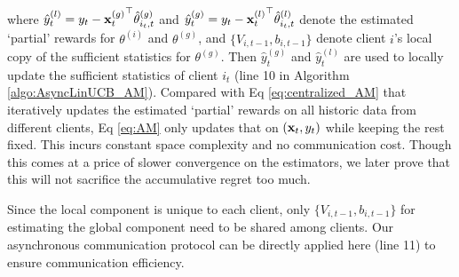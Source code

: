 where $\hat{y}^{(l)}_{t}=y_{t}-{\mathbf{x}_{t}^{(g)}}^{\top} \hat{\theta}^{(g)}_{i_{t},t}$ and $\hat{y}^{(g)}_{t}=y_{t}-{\mathbf{x}_{t}^{(l)}}^{\top} \hat{\theta}^{(l)}_{i_{t},t}$ denote the estimated `partial' rewards for $\theta^{(i)}$ and $\theta^{(g)}$, and $\{{V}_{i,t-1},{b}_{i,t-1}\}$ denote client $i$'s local copy of the sufficient statistics for $\theta^{(g)}$. Then $\hat{y}^{(g)}_{t}$ and $\hat{y}^{(l)}_{t}$ are used to locally update the sufficient statistics of client $i_{t}$ (line 10 in Algorithm \ref{algo:AsyncLinUCB_AM}). Compared with Eq \eqref{eq:centralized_AM} that iteratively updates the estimated `partial' rewards on all historic data from different clients, Eq \eqref{eq:AM} only updates that on $(\mathbf{x}_{t},y_{t})$ while keeping the rest fixed. This incurs constant space complexity and no communication cost. Though this comes at a price of slower convergence on the estimators, we later prove that this will not sacrifice the accumulative regret too much.

Since the local component is unique to each client, only $\{{V}_{i,t-1},{b}_{i,t-1}\}$ for estimating the global component need to be shared among clients. Our asynchronous communication protocol can be directly applied here (line 11) to ensure communication efficiency. 



